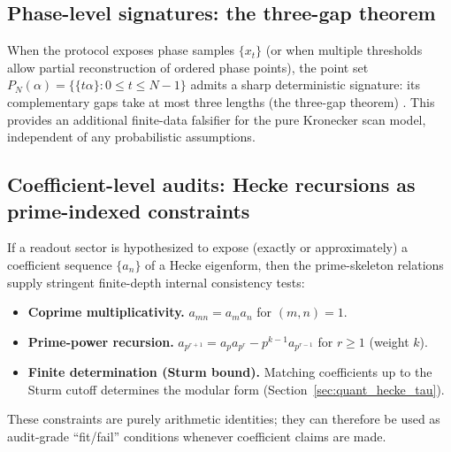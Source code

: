 \subsection{Phase-level signatures: the three-gap theorem}
\label{app:three_gap_fitting}

When the protocol exposes phase samples $\{x_t\}$ (or when multiple thresholds allow partial reconstruction of ordered phase points), the point set $P_N(\alpha)=\{\{t\alpha\}:0\le t\le N-1\}$ admits a sharp deterministic signature: its complementary gaps take at most three lengths (the three-gap theorem) \cite{Slater1967}.
This provides an additional finite-data falsifier for the pure Kronecker scan model, independent of any probabilistic assumptions.

\subsection{Coefficient-level audits: Hecke recursions as prime-indexed constraints}
\label{app:hecke_fitting}

If a readout sector is hypothesized to expose (exactly or approximately) a coefficient sequence $\{a_n\}$ of a Hecke eigenform, then the prime-skeleton relations supply stringent finite-depth internal consistency tests:
\begin{itemize}
  \item \textbf{Coprime multiplicativity.} $a_{mn}=a_m a_n$ for $(m,n)=1$.
  \item \textbf{Prime-power recursion.} $a_{p^{r+1}}=a_p a_{p^r}-p^{k-1}a_{p^{r-1}}$ for $r\ge 1$ (weight $k$).
  \item \textbf{Finite determination (Sturm bound).}
  Matching coefficients up to the Sturm cutoff determines the modular form \cite{Sturm1987,DiamondShurman2005} (Section~\ref{sec:quant_hecke_tau}).
\end{itemize}
These constraints are purely arithmetic identities; they can therefore be used as audit-grade ``fit/fail'' conditions whenever coefficient claims are made.


